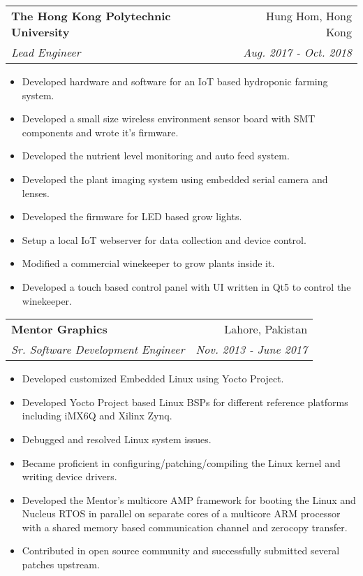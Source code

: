\documentclass[a4paper,11pt]{article}
\makeatletter
\newcommand{\work}[4]{
    \begin{tabular*}{7.1in}{l@{\extracolsep{\fill}}r}
        \textbf{#1} & #2 \\
        \textit{#3} & \textit{#4} \\
    \end{tabular*}\vspace{-5pt}
}
\newcommand{\listitemone}{\item}
\newcommand{\listitemtwo}{\item[$\circ$]}
\makeatother
\begin{document}
\listitemone
    \work {The Hong Kong Polytechnic University}{Hung Hom, Hong Kong}
        {Lead Engineer}{Aug. 2017 - Oct. 2018}
	    \begin{itemize}[leftmargin=0.2in]
	        \listitemtwo
	            Developed hardware and software for an IoT based 
	            hydroponic farming system.
	        \listitemtwo
	            Developed a small size wireless environment sensor board
	            with SMT components and wrote it's firmware.
	        \listitemtwo
	            Developed the nutrient level monitoring and auto 
	            feed system.
	        \listitemtwo
	            Developed the plant imaging system using embedded serial
	            camera and lenses.
	        \listitemtwo
	            Developed the firmware for LED based grow lights.
	        \listitemtwo
	            Setup a local IoT webserver for data collection and 
	            device control.
	        \listitemtwo
	            Modified a commercial winekeeper to grow plants inside it.
	        \listitemtwo
	            Developed a touch based control panel with UI written 
	            in Qt5 to control the winekeeper.
	    \end{itemize}

\listitemone
    \work {Mentor Graphics}{Lahore, Pakistan}
        {Sr. Software Development Engineer}{Nov. 2013 - June 2017}
	    \begin{itemize}[leftmargin=0.2in]
	        \listitemtwo
	            Developed customized Embedded Linux using Yocto Project.
	        \listitemtwo
	            Developed Yocto Project based Linux BSPs for  
	            different reference platforms including iMX6Q and 
	            Xilinx Zynq.
            \listitemtwo
                Debugged and resolved Linux system issues.
            \listitemtwo
                Became proficient in configuring/patching/compiling
                the Linux kernel and writing device drivers.
            \listitemtwo
                Developed the Mentor's multicore AMP framework for
                booting the Linux and Nucleus RTOS in parallel on
                separate cores of a multicore ARM processor with a
                shared memory based communication channel and 
                zerocopy transfer.
            \listitemtwo
                Contributed in open source community and successfully
                submitted several patches upstream.
	    \end{itemize}
	    
\end{document}
